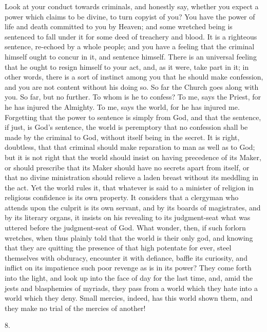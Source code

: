 Look at your conduct towards criminals, and honestly say, whether
you expect a power which claims to be divine, to turn copyist of you?
You have the power of life and death committed to you by Heaven; and
some wretched being is sentenced to fall under it for some deed of
treachery and blood. It is a righteous sentence, re-echoed by a whole
people; and you have a feeling that the criminal himself ought to
concur in it, and sentence himself. There is an universal feeling that
he ought to resign himself to your act, and, as it were, take part in
it; in other words, there is a sort of instinct among you that he
should make confession, and you are not content without his doing so.
So far the Church goes along with you. So far, but no further. To whom
is he to confess? To me, says the Priest, for he has injured the
Almighty. To me, says the world, for he has injured me. Forgetting
that the power to sentence is simply from God, and that the sentence,
if just, is God's sentence, the world is peremptory that no confession
shall be made by the criminal to God, without itself being in the
secret. It is right, doubtless, that that criminal should make
reparation to man as well as to God; but it is not right that the
world should insist on having precedence of its Maker, or should
prescribe that its Maker should have no secrets apart from itself, or
that no divine ministration should relieve a laden breast without its
meddling in the act. Yet the world rules it, that whatever is said to
a minister of religion in religious confidence is its own property. It
considers that a clergyman who attends upon the culprit is its own
servant, and by its boards of magistrates, and by its literary organs,
it insists on his revealing to its judgment-seat what was uttered
before the judgment-seat of God. What wonder, then, if such forlorn
wretches, when thus plainly told that the world is their only god, and
knowing that they are quitting the presence of that high potentate for
ever, steel themselves with obduracy, encounter it with defiance,
baffle its curiosity, and inflict on its impatience such poor revenge
as is in its power? They come forth into the light, and look up into
the face of day for the last time, and, amid the jests and blasphemies
of myriads, they pass from a world which they hate into a world which
they deny. Small mercies, indeed, has this world shown them, and they
make no trial of the mercies of another!

8.

